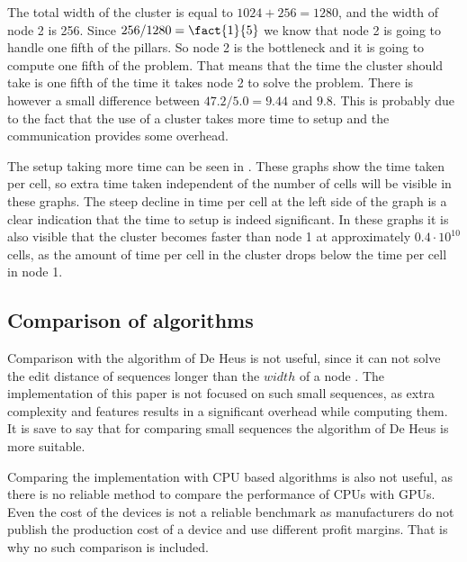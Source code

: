 The total width of the cluster is equal to $1024 + 256 = 1280$, and the width of node 2 is 256.
Since $256 / 1280 = \fact{1}{5}$ we know that node 2 is going to handle one fifth of the pillars.
So node 2 is the bottleneck and it is going to compute one fifth of the problem.
That means that the time the cluster should take is one fifth of the time it takes node 2 to solve the problem.
There is however a small difference between $47.2 / 5.0 = 9.44$ and $9.8$.
This is probably due to the fact that the use of a cluster takes more time to setup and the communication provides some overhead.

The setup taking more time can be seen in .
These graphs show the time taken per cell, so extra time taken independent of the number of cells will be visible in these graphs.
The steep decline in time per cell at the left side of the graph is a clear indication that the time to setup is indeed significant.
In these graphs it is also visible that the cluster becomes faster than node 1 at approximately $0.4 \cdot 10^{10}$ cells, as the amount of time per cell in the cluster drops below the time per cell in node 1.

\subsection{Comparison of algorithms}
Comparison with the algorithm of De Heus is not useful, since it can not solve the edit distance of sequences longer than the $width$ of a node \cite{Heus}.
The implementation of this paper is not focused on such small sequences, as extra complexity and features results in a significant overhead while computing them.
It is save to say that for comparing small sequences the algorithm of De Heus is more suitable.

Comparing the implementation with CPU based algorithms is also not useful, as there is no reliable method to compare the performance of CPUs with GPUs.
Even the cost of the devices is not a reliable benchmark as manufacturers do not publish the production cost of a device and use different profit margins.
That is why no such comparison is included.

